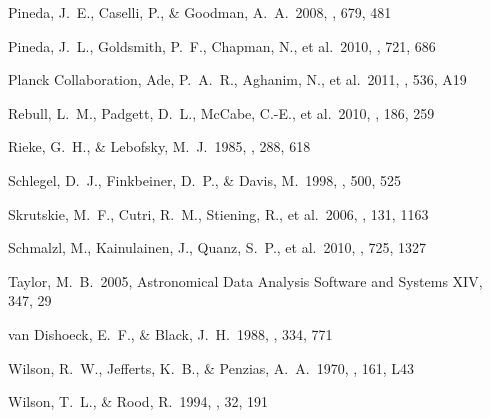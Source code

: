 \documentclass{aa}
\begin{document}
\begin{thebibliography}{}
 Pineda, J.~E., Caselli, P., \& Goodman, A.~A.\ 2008, \apj, 679, 481 

 Pineda, J.~L., Goldsmith, P.~F., Chapman, N., et al.\ 2010, \apj, 721, 686 

 Planck Collaboration, Ade, P.~A.~R., Aghanim, N., et al.\ 2011, \aap, 536, A19 

 Rebull, L.~M., Padgett, D.~L., McCabe, C.-E., et al.\ 2010, \apjs, 186, 259 

 Rieke, G.~H., \& Lebofsky, M.~J.\ 1985, \apj, 288, 618 

 Schlegel, D.~J., Finkbeiner, D.~P., \& Davis, M.\ 1998, \apj, 500, 525 

 Skrutskie, M.~F., Cutri, R.~M., Stiening, R., et al.\ 2006, \aj, 131, 1163 

 Schmalzl, M., Kainulainen, J., Quanz, S.~P., et al.\ 2010, \apj, 725, 1327 


 Taylor, M.~B.\ 2005, Astronomical Data Analysis Software and Systems XIV, 347, 29 

 van Dishoeck, E.~F., \& Black, J.~H.\ 1988, \apj, 334, 771 

 Wilson, R.~W., Jefferts, K.~B., \& Penzias, A.~A.\ 1970, \apjl, 161, L43 

 Wilson, T.~L., \& Rood, R.\ 1994, \araa, 32, 191 

\end{thebibliography}
\end{document}
